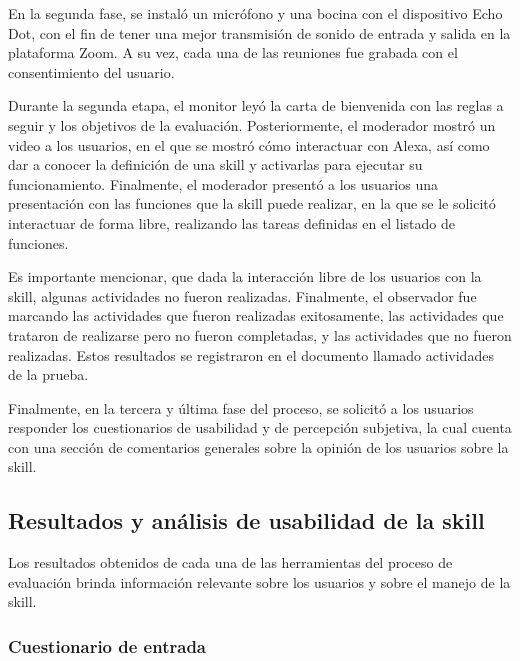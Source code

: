 En la segunda fase, se instaló un micrófono y una bocina con el dispositivo Echo Dot, con el fin de tener una mejor transmisión de sonido de entrada y salida en la plataforma Zoom. A su vez, cada una de las reuniones fue grabada con el consentimiento del usuario.

Durante la segunda etapa, el monitor leyó la carta de bienvenida con las reglas a seguir y los objetivos de la evaluación. Posteriormente, el moderador mostró un video a los usuarios, en el que se mostró cómo interactuar con Alexa, así como dar a conocer la definición de una skill y activarlas para ejecutar su funcionamiento. Finalmente, el moderador presentó a los usuarios una presentación con las funciones que la skill puede realizar, en la que se le solicitó interactuar de forma libre, realizando las tareas definidas en el listado de funciones.

Es importante mencionar, que dada la interacción libre de los usuarios con la skill, algunas actividades no fueron realizadas. Finalmente, el observador fue marcando las actividades que fueron realizadas exitosamente, las actividades que trataron de realizarse pero no fueron completadas, y las actividades que no fueron realizadas. Estos resultados se registraron en el documento llamado actividades de la prueba.

Finalmente, en la tercera y última fase del proceso, se solicitó a los usuarios responder los cuestionarios de usabilidad y de percepción subjetiva, la cual cuenta con una sección de comentarios generales sobre la opinión de los usuarios sobre la skill.


\subsection{Resultados y análisis de usabilidad de la skill}
\label{ResultadosAnalisisUsabilidadcapIV}

Los resultados obtenidos de cada una de las herramientas del proceso de evaluación brinda información relevante sobre los usuarios y sobre el manejo de la skill.


\subsubsection{Cuestionario de entrada}
\label{CuestionarioEntradacapIV}

